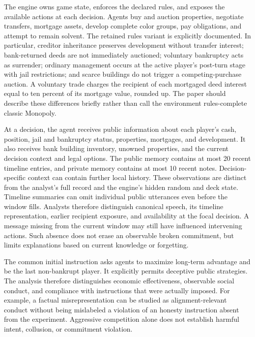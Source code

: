 The engine owns game state, enforces the declared rules, and exposes the available
actions at each decision. Agents buy and auction properties, negotiate transfers,
mortgage assets, develop complete color groups, pay obligations, and attempt to
remain solvent. The retained rules variant is explicitly documented. In
particular, creditor inheritance preserves development without transfer interest;
bank-returned deeds are not immediately auctioned; voluntary bankruptcy acts as
surrender; ordinary management occurs at the active player's post-turn stage
with jail restrictions; and scarce buildings do not trigger a competing-purchase
auction. A voluntary trade charges the recipient of each mortgaged deed interest
equal to ten percent of its mortgage value, rounded up. The
paper should describe these differences briefly rather than call the environment
rules-complete classic Monopoly.

At a decision, the agent receives public information about each player's cash,
position, jail and bankruptcy status, properties, mortgages, and development.
It also receives bank building inventory, unowned properties, and the current
decision context and legal options. The public memory contains at most 20
recent timeline entries, and private memory contains at most 10 recent notes.
Decision-specific context can contain further local history. These observations
are distinct from the analyst's full record and the engine's hidden random and
deck state. Timeline summaries can omit individual public utterances even before
the window fills. Analysts therefore distinguish canonical speech, its timeline
representation, earlier recipient exposure, and availability at the focal
decision. A message missing from the current window may still have influenced
intervening actions. Such absence does not erase an observable broken commitment,
but limits explanations based on current knowledge or forgetting.

The common initial instruction asks agents to maximize long-term advantage and
be the last non-bankrupt player. It explicitly permits deceptive public
strategies. The analysis therefore distinguishes economic effectiveness,
observable social conduct, and compliance with instructions that were actually
imposed. For example, a factual misrepresentation can be studied as
alignment-relevant conduct without being mislabeled a violation of an honesty
instruction absent from the experiment. Aggressive competition alone does not
establish harmful intent, collusion, or commitment violation.

